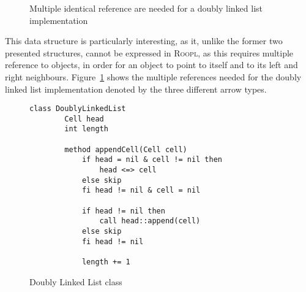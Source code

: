 \begin{figure}[ht]
    \centering
    \caption{Multiple identical reference are needed for a doubly linked list implementation}
    \label{fig:doubly-linked-list-reference}
\end{figure}

This data structure is particularly interesting, as it, unlike the former two presented structures, cannot be expressed in \textsc{Roopl}, as this requires multiple reference to objects, in order for an object to point to itself and to its left and right neighbours. Figure~\ref{fig:doubly-linked-list-reference} shows the multiple references needed for the doubly linked list implementation denoted by the three different arrow types.

\begin{figure}[ht!]
    \centering
    \begin{lstlisting}[style = basic, language = roopl] 
    class DoublyLinkedList
        Cell head
        int length
    
        method appendCell(Cell cell)
            if head = nil & cell != nil then
                head <=> cell
            else skip
            fi head != nil & cell = nil
    
            if head != nil then 
                call head::append(cell)
            else skip
            fi head != nil
    
            length += 1
    \end{lstlisting}
    \caption{Doubly Linked List class}
    \label{fig:doubly-linked-list-class}
\end{figure}

